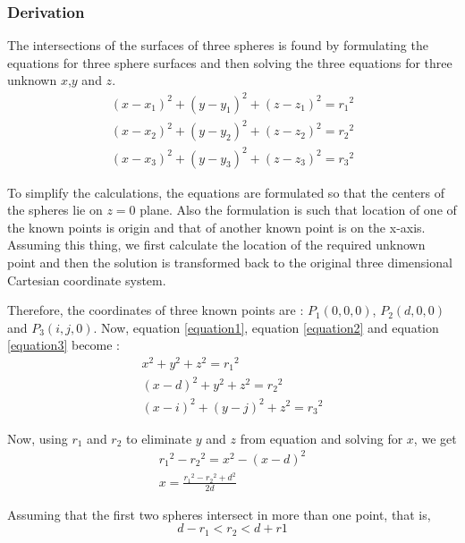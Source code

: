 \subsubsection{Derivation}
The intersections of the surfaces of three spheres is found by formulating the equations for three sphere surfaces and then solving the three equations for three unknown $x$,$y$ and $z$.
\begin{eqnarray}
	\label{equation1} (x-x_1)^2+(y-y_1)^2+(z-z_1)^2={r_1}^2 \\
	\label{equation2} (x-x_2)^2+(y-y_2)^2+(z-z_2)^2={r_2}^2 \\
	\label{equation3} (x-x_3)^2+(y-y_3)^2+(z-z_3)^2={r_3}^2 
\end{eqnarray}

To simplify the calculations, the equations are formulated so that the centers of the spheres lie on $z=0$ plane. Also the formulation is such that location of one of the known points is origin and that of another known point is on the x-axis. Assuming this thing, we first calculate the location of the required unknown point and then the solution is transformed back to the original three dimensional Cartesian coordinate system.

Therefore, the coordinates of three known points are : $P_1(0,0,0)$, $P_2(d,0,0)$ and $P_3(i,j,0)$. Now, equation \ref{equation1}, equation \ref{equation2} and equation \ref{equation3} become :
\begin{eqnarray}
	\label{equation4}  x^2+y^2+z^2={r_1}^2 \\ 
	\label{equation5} (x-d)^2+y^2+z^2={r_2}^2 \\ 
	\label{equation6} (x-i)^2+(y-j)^2+z^2={r_3}^2 
\end{eqnarray}

Now, using $r_1$ and $r_2$ to eliminate $y$ and $z$ from equation and solving for $x$, we get
\begin{eqnarray}
\nonumber	{r_1}^2-{r_2}^2=x^2-(x-d)^2 \\ 
	x=\frac{{r_1}^2-{r_2}^2+d^2}{2d}
\end{eqnarray}

Assuming that the first two spheres intersect in more than one point, that is,
\begin{equation}
	d-r_1<r_2<d+r1 \nonumber
\end{equation}


